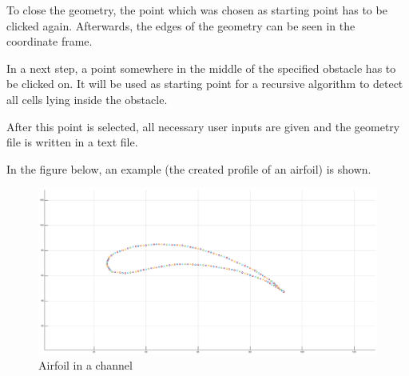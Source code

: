 \begin{itemize}
To close the geometry, the point which was chosen as starting point has to be clicked again. Afterwards, the edges of the geometry can be seen in the coordinate frame.

In a next step, a point somewhere in the middle of the specified obstacle has to be clicked on. It will be used as starting point for a recursive algorithm to detect all cells lying inside the obstacle.

After this point is selected, all necessary user inputs are given and the geometry file is written in a text file.

In the figure below, an example (the created profile of an airfoil) is shown.


\begin{figure}[!htb]
\centering
\includegraphics[scale=.23]{FIGURES/airfoil.eps}
\caption{Airfoil in a channel}
\label{fig:circle_in_channel}
\end{figure} 

\end{itemize}




